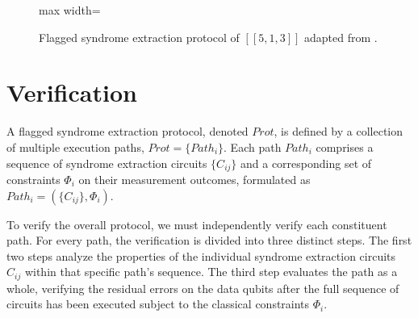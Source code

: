 \documentclass[acmsmallw,review]{acmart}
\begin{document}
\begin{figure}[h]
\begin{adjustbox}{max width=\textwidth}
    \end{adjustbox}
    \caption{Flagged syndrome extraction protocol of $[[5,1,3]]$ adapted from \cite{CR18a}.}
    \label{fig:flowchart}
\end{figure}






\section{Verification}
A flagged syndrome extraction protocol, denoted $Prot$, is defined by a collection of multiple execution paths, $Prot = \{Path_i\}$. Each path $Path_i$ comprises a sequence of syndrome extraction circuits $\{C_{ij}\}$ and a corresponding set of constraints $\Phi_i$ on their measurement outcomes, formulated as $Path_i = (\{C_{ij}\}, \Phi_i)$. 

To verify the overall protocol, we must independently verify each constituent path. For every path, the verification is divided into three distinct steps. The first two steps analyze the properties of the individual syndrome extraction circuits $C_{ij}$ within that specific path's sequence. The third step evaluates the path as a whole, verifying the residual errors on the data qubits after the full sequence of circuits has been executed subject to the classical constraints $\Phi_i$.
\end{document}

